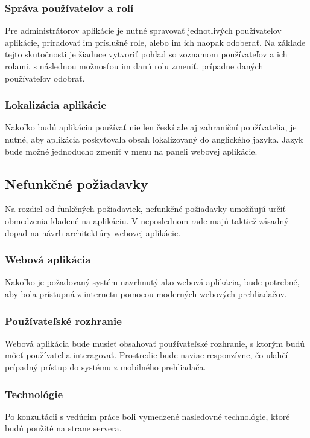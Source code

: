 \subsubsection{Správa používatelov a rolí}\label{sprava-pouzivatelov-a-roli}
Pre administrátorov aplikácie je nutné spravovať jednotlivých používateľov aplikácie, priradovať im príslušné role, alebo im ich naopak odoberať. Na základe tejto skutočnosti je žiaduce vytvoriť pohľad so zoznamom používateľov a ich rolami, s následnou možnosťou im danú rolu zmeniť, prípadne daných používateľov odobrať.

\subsubsection{Lokalizácia aplikácie}
Nakoľko budú aplikáciu používať nie len českí ale aj zahraniční používatelia, je nutné, aby aplikácia poskytovala obsah lokalizovaný do anglického jazyka. Jazyk bude možné jednoducho zmeniť v menu na paneli webovej aplikácie.

\subsection{Nefunkčné požiadavky}
Na rozdiel od funkčných požiadaviek, nefunkčné požiadavky umožňujú určiť obmedzenia kladené na aplikáciu. V neposlednom rade majú taktiež zásadný dopad na návrh architektúry webovej aplikácie.\cite{nefunkcne-poziadavky}

\subsubsection{Webová aplikácia}
Nakoľko je požadovaný systém navrhnutý ako webová aplikácia, bude potrebné, aby bola prístupná z internetu pomocou moderných webových prehliadačov.

\subsubsection{Používateľské rozhranie}
Webová aplikácia bude musieť obsahovať používateľské rozhranie, s ktorým budú môcť používatelia interagovať.
Prostredie bude naviac responzívne, čo uľahčí prípadný prístup do systému z mobilného prehliadača.

\subsubsection{Technológie}
Po konzultácii s vedúcim práce boli vymedzené nasledovné technológie, ktoré budú použité na strane servera.

